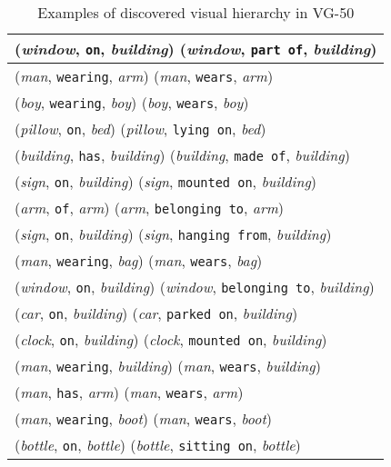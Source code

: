 \documentclass[runningheads]{llncs}
\begin{document}
{
\begin{longtable}{ l }
\caption{Examples of discovered visual hierarchy in VG-50}
\label{table:vg50_vis_h}\\
\hline
(\textit{window}, \texttt{on}, \textit{building})  (\textit{window}, \texttt{part of}, \textit{building}) \\ \hline
(\textit{man}, \texttt{wearing}, \textit{arm})  (\textit{man}, \texttt{wears}, \textit{arm}) \\ \hline
(\textit{boy}, \texttt{wearing}, \textit{boy})  (\textit{boy}, \texttt{wears}, \textit{boy}) \\ \hline
(\textit{pillow}, \texttt{on}, \textit{bed})  (\textit{pillow}, \texttt{lying on}, \textit{bed}) \\ \hline
(\textit{building}, \texttt{has}, \textit{building})  (\textit{building}, \texttt{made of}, \textit{building}) \\ \hline
(\textit{sign}, \texttt{on}, \textit{building})  (\textit{sign}, \texttt{mounted on}, \textit{building}) \\ \hline
(\textit{arm}, \texttt{of}, \textit{arm})  (\textit{arm}, \texttt{belonging to}, \textit{arm}) \\ \hline
(\textit{sign}, \texttt{on}, \textit{building})  (\textit{sign}, \texttt{hanging from}, \textit{building}) \\ \hline
(\textit{man}, \texttt{wearing}, \textit{bag})  (\textit{man}, \texttt{wears}, \textit{bag}) \\ \hline
(\textit{window}, \texttt{on}, \textit{building})  (\textit{window}, \texttt{belonging to}, \textit{building}) \\ \hline
(\textit{car}, \texttt{on}, \textit{building})  (\textit{car}, \texttt{parked on}, \textit{building}) \\ \hline
(\textit{clock}, \texttt{on}, \textit{building})  (\textit{clock}, \texttt{mounted on}, \textit{building}) \\ \hline
(\textit{man}, \texttt{wearing}, \textit{building})  (\textit{man}, \texttt{wears}, \textit{building}) \\ \hline
(\textit{man}, \texttt{has}, \textit{arm})  (\textit{man}, \texttt{wears}, \textit{arm}) \\ \hline
(\textit{man}, \texttt{wearing}, \textit{boot})  (\textit{man}, \texttt{wears}, \textit{boot}) \\ \hline
(\textit{bottle}, \texttt{on}, \textit{bottle})  (\textit{bottle}, \texttt{sitting on}, \textit{bottle}) \\ \hline

\end{longtable}}
\end{document}
